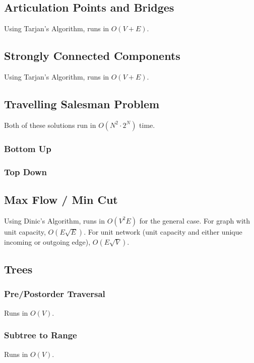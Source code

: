 \documentclass{article}
\begin{document}
\subsection{Articulation Points and Bridges}
Using Tarjan's Algorithm, runs in $O(V + E)$.


\subsection{Strongly Connected Components}
Using Tarjan's Algorithm, runs in $O(V + E)$.


\subsection{Travelling Salesman Problem}
Both of these solutions run in $O(N^2 \cdot 2^N)$ time.
\subsubsection{Bottom Up}


\subsubsection{Top Down}


\subsection{Max Flow / Min Cut}
Using Dinic's Algorithm, runs in $O(V^2 E)$ for the general case.
For graph with unit capacity, $O(E\sqrt{E})$.
For unit network (unit capacity and either unique incoming or outgoing edge), $O(E\sqrt{V})$.


\subsection{Trees}

\subsubsection{Pre/Postorder Traversal}
Runs in $O(V)$.


\subsubsection{Subtree to Range}
Runs in $O(V)$.

\end{document}
